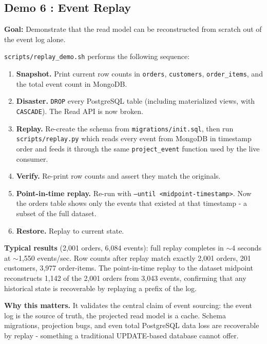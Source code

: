 \documentclass[11pt,a4paper]{article}
\newcommand{\code}[1]{\texttt{\small #1}}
\newcommand{\file}[1]{\textcolor{primary}{\texttt{\small #1}}}
\begin{document}
\subsection{Demo 6 : Event Replay}

\textbf{Goal:} Demonstrate that the read model can be reconstructed from scratch out of the event log alone.

\file{scripts/replay\_demo.sh} performs the following sequence:

\begin{enumerate}
  \item \textbf{Snapshot.} Print current row counts in \code{orders}, \code{customers}, \code{order\_items}, and the total event count in MongoDB.
  \item \textbf{Disaster.} \code{DROP} every PostgreSQL table (including materialized views, with \code{CASCADE}). The Read API is now broken.
  \item \textbf{Replay.} Re-create the schema from \file{migrations/init.sql}, then run \file{scripts/replay.py} which reads every event from MongoDB in timestamp order and feeds it through the same \code{project\_event} function used by the live consumer.
  \item \textbf{Verify.} Re-print row counts and assert they match the originals.
  \item \textbf{Point-in-time replay.} Re-run with \code{--until <midpoint-timestamp>}. Now the orders table shows only the events that existed at that timestamp - a subset of the full dataset.
  \item \textbf{Restore.} Replay to current state.
\end{enumerate}

\textbf{Typical results} (2{,}001 orders, 6{,}084 events): full replay completes in $\sim$4 seconds at $\sim$1{,}550 events/sec. Row counts after replay match exactly 2{,}001 orders, 201 customers, 3{,}977 order-items. The point-in-time replay to the dataset midpoint reconstructs 1{,}142 of the 2{,}001 orders from 3{,}043 events, confirming that any historical state is recoverable by replaying a prefix of the log.


\textbf{Why this matters.} It validates the central claim of event sourcing: the event log is the source of truth, the projected read model is a cache. Schema migrations, projection bugs, and even total PostgreSQL data loss are recoverable by replay - something a traditional UPDATE-based database cannot offer.

\end{document}
